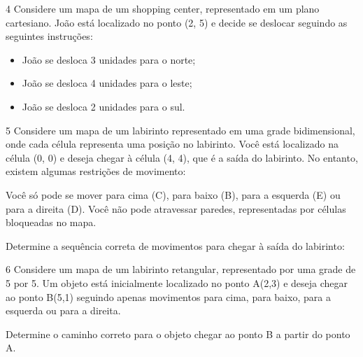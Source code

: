 \num{4} Considere um mapa de um shopping center, representado em um plano
cartesiano. João está localizado no ponto (2, 5) e decide se deslocar
seguindo as seguintes instruções:

\begin{itemize}
\item João se desloca 3 unidades para o norte; 
\item João se desloca 4 unidades para o leste; 
\item João se desloca 2 unidades para o sul.
\end{itemize}


\num{5} Considere um mapa de um labirinto representado em uma grade
bidimensional, onde cada célula representa uma posição no labirinto.
Você está localizado na célula (0, 0) e deseja chegar à célula (4, 4),
que é a saída do labirinto. No entanto, existem algumas restrições de
movimento:

Você só pode se mover para cima (C), para baixo (B), para a esquerda (E)
ou para a direita (D). Você não pode atravessar paredes, representadas
por células bloqueadas no mapa.

Determine a sequência correta de movimentos para chegar à saída do
labirinto:


\num{6} Considere um mapa de um labirinto retangular, representado por uma
grade de 5 por 5. Um objeto está inicialmente localizado no ponto A(2,3) e 
deseja chegar ao ponto B(5,1) seguindo apenas movimentos para
cima, para baixo, para a esquerda ou para a direita.

Determine o caminho correto para o objeto chegar ao ponto B a partir do
ponto A.


